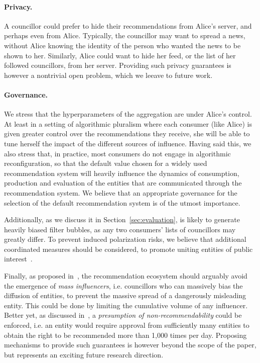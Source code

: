 \paragraph{Privacy.}
A councillor could prefer to hide their recommendations 
from Alice's \Veche{} server, and perhaps even from Alice.
Typically, the councillor may want to spread a news,
without Alice knowing the identity of the person 
who wanted the news to be shown to her.
Similarly, Alice could want to hide her feed,
or the list of her followed councillors, 
from her \Veche{} server.
Providing such privacy guarantees is however a nontrivial open problem,
which we leeave to future work.

\paragraph{Governance.}
We stress that the hyperparameters of the aggregation are under Alice's control.
At least in a setting of algorithmic pluralism where each consumer (like Alice)
is given greater control over the recommendations they receive,
she will be able to tune herself the impact of the different sources of influence.
Having said this, we also stress that, in practice,
most consumers do not engage in algorithmic reconfiguration,
so that the default value chosen for a widely used recommendation system
will heavily influence the dynamics of consumption, production and evaluation 
of the entities that are communicated through the recommendation system.
We believe that an appropriate governance 
for the selection of the default recommendation system is of the utmost importance.

Additionally, as we discuss it in Section~\ref{sec:evaluation},
\Veche{} is likely to generate heavily biased filter bubbles,
as any two consumers' lists of councillors may greatly differ.
To prevent induced polarization risks,
we believe that additional coordinated measures should be considered,
to promote uniting entities of public interest~\cite{hoang2025tournesol}.

Finally, as proposed in~\cite{hoang2022solidago},
the recommendation ecosystem should arguably avoid 
the emergence of \emph{mass influencers},
i.e. councillors who can massively bias the diffusion of entities,
to prevent the massive spread of a dangerously misleading entity.
This could be done by limiting the cumulative volume of any influencer.
Better yet, as discussed in~\cite{hoang2022solidago},
a \emph{presumption of non-recommendability} could be enforced, 
i.e. an entity would require approval from sufficiently many entities
to obtain the right to be recommended more than 1,000 times per day.
Proposing mechanisms to provide such guarantees is however 
beyond the scope of the paper, 
but represents an exciting future research direction.
